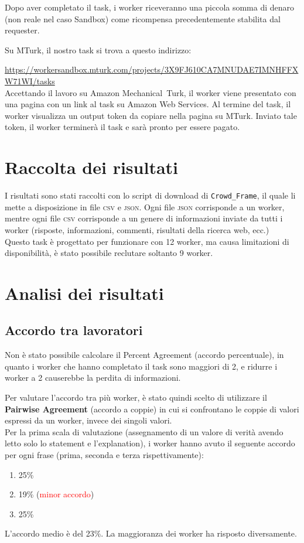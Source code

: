 \documentclass[a4paper, 11pt, twoside]{article}
\begin{document}
Dopo aver completato il task, i worker riceveranno una piccola somma di denaro (non reale nel caso Sandbox) come ricompensa precedentemente stabilita dal requester.

Su MTurk, il nostro task si trova a questo indirizzo:

\url{https://workersandbox.mturk.com/projects/3X9FJ610CA7MNUDAE7IMNHFFXW71WI/tasks} \\

Accettando il lavoro su Amazon Mechanical~Turk, il worker viene presentato con una pagina con un link al task su Amazon Web Services. Al termine del task, il worker visualizza un output token da copiare nella pagina su MTurk. Inviato tale token, il worker terminerà il task e sarà pronto per essere pagato.

\section{Raccolta dei risultati}
I risultati sono stati raccolti con lo script di download di \texttt{Crowd\_Frame}, il quale li mette a disposizione in file \textsc{csv} e \textsc{json}. Ogni file \textsc{json} corrisponde a un worker, mentre ogni file \textsc{csv} corrisponde a un genere di informazioni inviate da tutti i worker (risposte, informazioni, commenti, risultati della ricerca web, ecc.) \\

Questo task è progettato per funzionare con 12 worker, ma causa limitazioni di disponibilità, è stato possibile reclutare soltanto 9 worker.

\section{Analisi dei risultati}
\subsection{Accordo tra lavoratori}
Non è stato possibile calcolare il Percent Agreement (accordo percentuale), in quanto i worker che hanno completato il task sono maggiori di 2, e ridurre i worker a 2 causerebbe la perdita di informazioni.

Per valutare l'accordo tra più worker, è stato quindi scelto di utilizzare il \textbf{Pairwise Agreement} (accordo a coppie) in cui si confrontano le coppie di valori espressi da un worker, invece dei singoli valori. \\

Per la prima scala di valutazione (assegnamento di un valore di verità avendo letto solo lo statement e l'explanation), i worker hanno avuto il seguente accordo per ogni frase (prima, seconda e terza rispettivamente):
\begin{enumerate}
    \item 25\%
    \item 19\% (\textcolor{red}{minor accordo})
    \item 25\%
\end{enumerate}
L'accordo medio è del 23\%. La maggioranza dei worker ha risposto diversamente. \\
\end{document}
